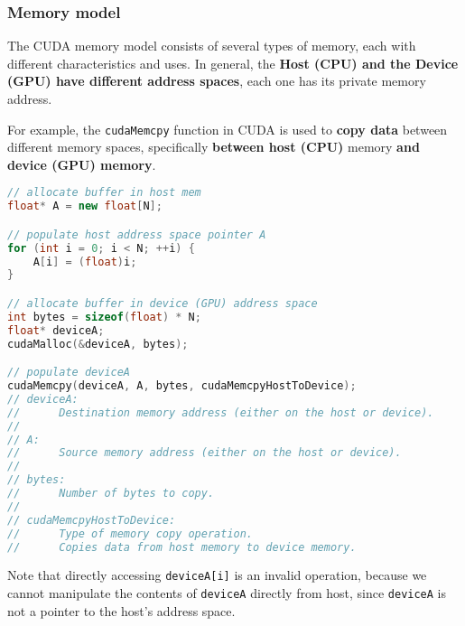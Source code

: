 \subsubsection{Memory model}\label{subsubsection: Memory model}

The CUDA memory model consists of several types of memory, each with different characteristics and uses. In general, the \textbf{Host (CPU) and the Device (GPU) have different address spaces}, each one has its private memory address.

\highspace
For example, the \texttt{cudaMemcpy} function in CUDA is used to \textbf{copy data} between different memory spaces, specifically \textbf{between host (CPU)} memory \textbf{and device (GPU) memory}.

\begin{lstlisting}[language=C++]
// allocate buffer in host mem
float* A = new float[N];

// populate host address space pointer A
for (int i = 0; i < N; ++i) {
    A[i] = (float)i;
}

// allocate buffer in device (GPU) address space
int bytes = sizeof(float) * N;
float* deviceA;
cudaMalloc(&deviceA, bytes);

// populate deviceA
cudaMemcpy(deviceA, A, bytes, cudaMemcpyHostToDevice);
// deviceA:
//      Destination memory address (either on the host or device).
//
// A:
//      Source memory address (either on the host or device).
//
// bytes:
//      Number of bytes to copy.
//
// cudaMemcpyHostToDevice:
//      Type of memory copy operation.
//      Copies data from host memory to device memory.
\end{lstlisting}
Note that directly accessing \texttt{deviceA[i]} is an invalid operation, because we cannot manipulate the contents of \texttt{deviceA} directly from host, since \texttt{deviceA} is not a pointer to the host's address space.

\newpage

